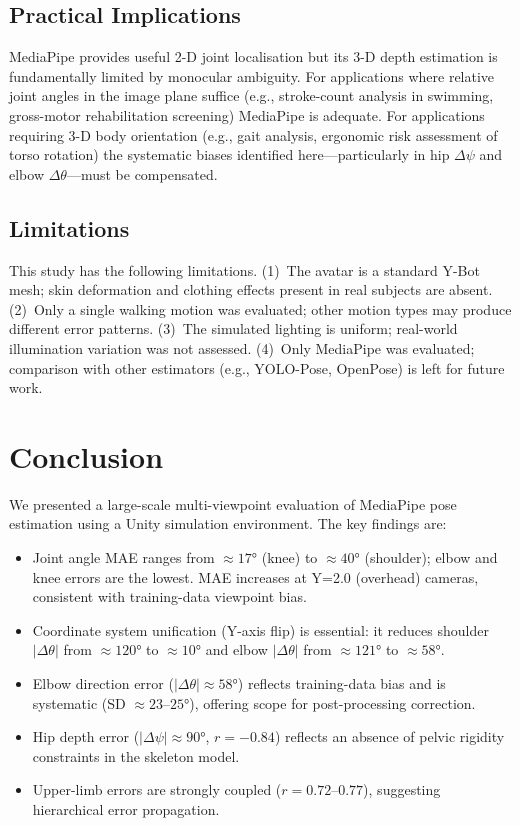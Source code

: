 \documentclass[twocolumn]{article}
\begin{document}
\subsection{Practical Implications}

MediaPipe provides useful 2-D joint localisation but its 3-D depth
estimation is fundamentally limited by monocular ambiguity.
For applications where relative joint angles in the image plane suffice
(e.g., stroke-count analysis in swimming, gross-motor rehabilitation
screening) MediaPipe is adequate. For applications requiring 3-D body
orientation (e.g., gait analysis, ergonomic risk assessment of torso
rotation) the systematic biases identified here—particularly in hip
$\Delta\psi$ and elbow $\Delta\theta$—must be compensated.

\subsection{Limitations}

This study has the following limitations. (1)~The avatar is a standard
Y-Bot mesh; skin deformation and clothing effects present in real subjects
are absent. (2)~Only a single walking motion was evaluated; other motion
types may produce different error patterns. (3)~The simulated lighting is
uniform; real-world illumination variation was not assessed. (4)~Only
MediaPipe was evaluated; comparison with other estimators (e.g., YOLO-Pose,
OpenPose) is left for future work.

\section{Conclusion}

We presented a large-scale multi-viewpoint evaluation of MediaPipe pose
estimation using a Unity simulation environment. The key findings are:
\begin{itemize}\itemsep0pt
  \item Joint angle MAE ranges from $\approx17°$ (knee) to $\approx40°$
        (shoulder); elbow and knee errors are the lowest.
        MAE increases at Y=2.0 (overhead) cameras, consistent with
        training-data viewpoint bias.
  \item Coordinate system unification (Y-axis flip) is essential:
        it reduces shoulder $|\Delta\theta|$ from $\approx120°$ to
        $\approx10°$ and elbow $|\Delta\theta|$ from $\approx121°$ to
        $\approx58°$.
  \item Elbow direction error ($|\Delta\theta|\approx58°$) reflects
        training-data bias and is systematic (SD $\approx23$–$25°$),
        offering scope for post-processing correction.
  \item Hip depth error ($|\Delta\psi|\approx90°$, $r=-0.84$) reflects
        an absence of pelvic rigidity constraints in the skeleton model.
  \item Upper-limb errors are strongly coupled ($r=0.72$–$0.77$),
        suggesting hierarchical error propagation.
\end{itemize}
\end{document}
